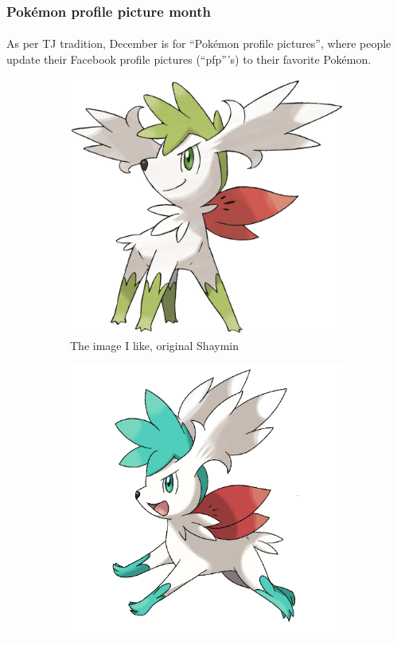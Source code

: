 \documentclass{beamer}                             %
\begin{document}
\begin{frame}
\frametitle{Pokémon profile picture month}
\framesubtitle{}
As per TJ tradition, December is for \enquote{Pokémon profile pictures},
where people update their Facebook profile pictures (\enquote{pfp}'s)
to their favorite Pokémon.

\begin{figure}[h!]
    \centering
    \begin{subfigure}[h]{0.3 \textwidth}
      \includegraphics[scale=0.1]{shaymin-sky.jpg}
      \caption{The image I like, original Shaymin}
    \end{subfigure}
    \hfill
    \begin{subfigure}[h]{0.3 \textwidth}
      \includegraphics[scale=1.17]{shaymin-color.png}

\end{subfigure}
\end{figure}
\end{frame}
\end{document}
